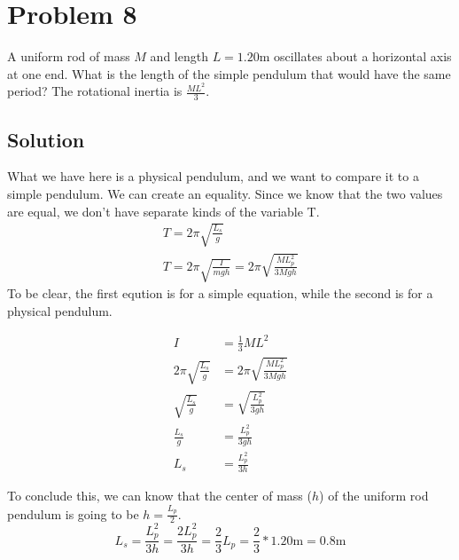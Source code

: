 \documentclass[12pt]{article}
\begin{document}
\pagebreak
\section{Problem 8}
A uniform rod of mass $M$ and length $L = 1.20 \unit{\meter}$ oscillates about a horizontal axis at one end. What is the length of the simple pendulum that would have the same period? The rotational inertia is $\frac{ML^2}{3}$.

\subsection{Solution}
What we have here is a physical pendulum, and we want to compare it to a simple pendulum. We can create an equality. Since we know that the two values are equal, we don't have separate kinds of the variable T. 
\begin{gather}
    T   =   2\pi\sqrt{\frac{L_s}{g}}\\
    T   =   2\pi\sqrt{\frac{I}{mgh}}
        =   2\pi\sqrt{\frac{ML_p^2}{3Mgh}}
\end{gather}
To be clear, the first eqution is for a simple equation, while the second is for a physical pendulum.

\begin{align}
    I   &=  \frac{1}{3}ML^2\\
    2\pi\sqrt{\frac{L_s}{g}}    &=  2\pi\sqrt{\frac{ML_p^2}{3Mgh}}\\
    \sqrt{\frac{L_s}{g}}  &=  \sqrt{\frac{L_p^2}{3gh}}\\
    \frac{L_s}{g}   &=  \frac{L_p^2}{3gh}\\
    L_s &=  \frac{L_p^2}{3h}
\end{align}

To conclude this, we can know that the center of mass ($h$) of the uniform rod pendulum is going to be \(h = \frac{L_p}{2}\).
\begin{equation}
    L_s =   \frac{L_p^2}{3h}
        =   \frac{2L_p^2}{3h}
        =   \frac{2}{3}L_p
        =   \frac{2}{3}*1.20\unit{\meter}
        =   \boxed{0.8\unit{\meter}}
\end{equation}
\end{document}
